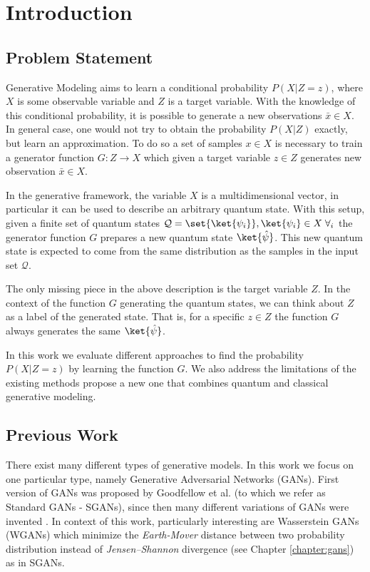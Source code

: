 \chapter{Introduction} \label{chapter:introduction}
\section{Problem Statement}
Generative Modeling aims to learn a conditional probability $P(X|Z = z)$, where
$X$ is some observable variable and $Z$ is a target variable. With the knowledge
of this conditional probability, it is possible to generate a new observations $\bar{x} \in X$. In general case, one would not try to obtain the probability $P(X|Z)$ exactly, but learn an approximation. To do so a set of samples $x \in X$ is necessary to train a generator function $G: Z \to X$ which given a target variable $z \in Z$ generates new observation $\bar{x} \in X$. 

In the generative framework, the variable $X$ is a multidimensional vector, in particular it can be used to describe an arbitrary quantum state. With this setup, given a finite set of quantum states $\mathcal{Q} = \set{\ket{\psi_i}}, \ket{\psi_i} \in X\; \forall_i$ the generator function $G$ prepares a new quantum state $\ket{\hat{\psi}}$. This new quantum state is expected to come from the same distribution as the samples in the input set $\mathcal{Q}$.

The only missing piece in the above description is the target variable $Z$. In
the context of the function $G$ generating the quantum states, we can think
about $Z$ as a label of the generated state. That is, for a specific $z \in Z$
the function $G$ always generates the same $\ket{\hat{\psi}}$.

In this work we evaluate different approaches to find the probability $P(X|Z =
z)$ by learning the function $G$. We also address the limitations of the
existing methods propose a new one that combines quantum and classical
generative modeling.
\section{Previous Work}
There exist many different types of generative models. In this work we focus on
one particular type, namely Generative Adversarial Networks (GANs). First
version of GANs was proposed by Goodfellow et al.
\cite{goodfellow2014generative} (to which we refer as Standard GANs - SGANs),
since then many different variations of GANs were invented
\cite{mirza2014conditional}\cite{karras2019stylebased}\cite{radford2016unsupervised}.
In context of this work, particularly interesting are Wasserstein GANs
(WGANs) \cite{arjovsky2017wasserstein} which minimize the \textit{Earth-Mover} distance
between two probability distribution instead of
\textit{Jensen–Shannon} divergence (see Chapter \ref{chapter:gans}) as in SGANs.


